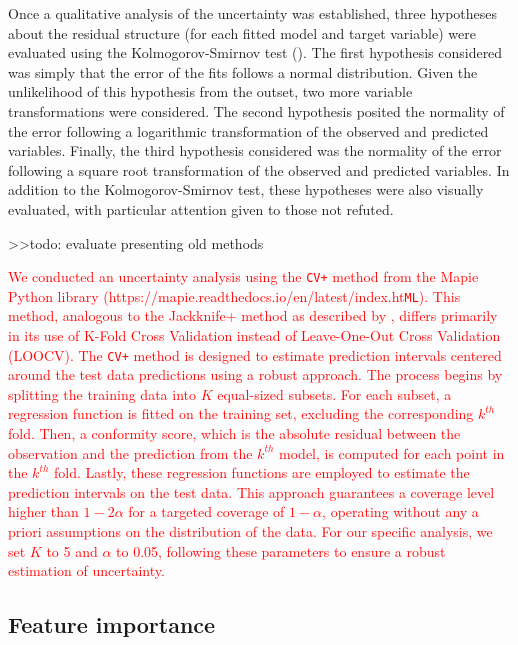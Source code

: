 \documentclass[12pt]{article}
\begin{document}
\par Once a qualitative analysis of the uncertainty was established, three hypotheses about the residual structure (for each fitted model and target variable) were evaluated using the Kolmogorov-Smirnov test (\cite{massey1951}). The first hypothesis considered was simply that the error of the fits follows a normal distribution. Given the unlikelihood of this hypothesis from the outset, two more variable transformations were considered. The second hypothesis posited the normality of the error following a logarithmic transformation of the observed and predicted variables. Finally, the third hypothesis considered was the normality of the error following a square root transformation of the observed and predicted variables. In addition to the Kolmogorov-Smirnov test, these hypotheses were also visually evaluated, with particular attention given to those not refuted.

\par >>todo: evaluate presenting old methods

\par \textcolor{red}{We conducted an uncertainty analysis using the \texttt{CV+} method from the Mapie Python library (https://mapie.readthedocs.io/en/latest/index.ht\texttt{ML}). This method, analogous to the Jackknife+ method as described by \cite{barber2021}, differs primarily in its use of K-Fold Cross Validation instead of Leave-One-Out Cross Validation (LOOCV). The \texttt{CV+} method is designed to estimate prediction intervals centered around the test data predictions using a robust approach. The process begins by splitting the training data into \( K \) equal-sized subsets. For each subset, a regression function is fitted on the training set, excluding the corresponding \( k^{th} \) fold. Then, a conformity score, which is the absolute residual between the observation and the prediction from the \( k^{th} \) model, is computed for each point in the \( k^{th} \) fold. Lastly, these regression functions are employed to estimate the prediction intervals on the test data. This approach guarantees a coverage level higher than \( 1- 2\alpha \) for a targeted coverage of \( 1- \alpha \), operating without any a priori assumptions on the distribution of the data. For our specific analysis, we set \( K \) to 5 and \( \alpha \) to 0.05, following these parameters to ensure a robust estimation of uncertainty.}  

\subsection{Feature importance} \label{sec:methods:importance}
\end{document}
